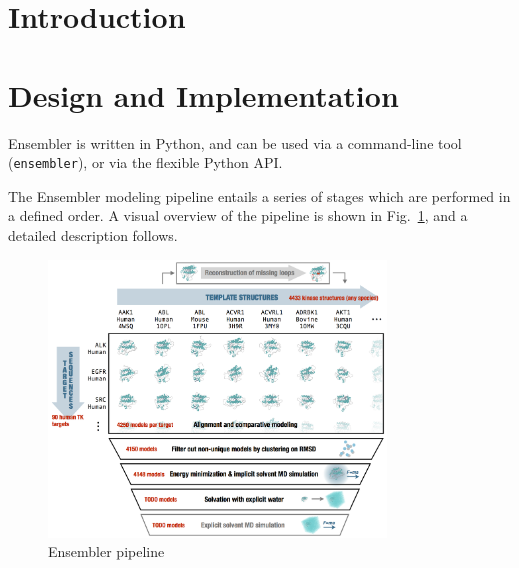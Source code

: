 \documentclass[aps,pre,twocolumn,nofootinbib,superscriptaddress,linenumbers]{revtex4-1}
\begin{document}
\maketitle

\section{Introduction}
\label{section:introduction}

\section{Design and Implementation}


Ensembler is written in Python, and can be used via a command-line tool ({\tt ensembler}), or via the flexible Python API.


The Ensembler modeling pipeline entails a series of stages which are performed in a defined order. 
A visual overview of the pipeline is shown in Fig.~\ref{figpipeline}, and a detailed description follows.

\begin{figure}[h]
  \centering
    \includegraphics[width=0.8\textwidth]{pipeline}
  \caption{Ensembler pipeline}
  \label{figpipeline}
\end{figure}
\end{document}
